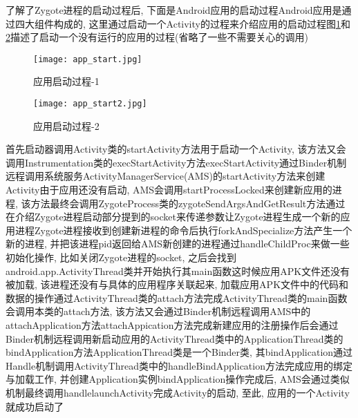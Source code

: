 了解了Zygote进程的启动过程后, 下面是Android应用的启动过程\juhao Android应用是通过四大组件构成的, 这里通过启动一个Activity的过程来介绍应用的启动过程\juhao 图\ref{appStart}和\ref{appStart2}描述了启动一个没有运行的应用的过程(省略了一些不需要关心的调用)\juhao
\begin{figure}[ht]
	\centering
	\texttt{[image: app\_start.jpg]}
	\caption{应用启动过程-1}
	\label{appStart}
\end{figure}

\begin{figure}[ht]
	\centering
	\texttt{[image: app\_start2.jpg]}
	\caption{应用启动过程-2}
	\label{appStart2}
\end{figure}
首先启动器调用Activity类的startActivity方法用于启动一个Activity, 该方法又会调用Instrumentation类的execStartActivity方法\juhao  execStartActivity通过Binder机制远程调用系统服务ActivityManagerService(AMS)的startActivity方法来创建Activity\juhao 由于应用还没有启动, AMS会调用startProcessLocked来创建新应用的进程, 该方法最终会调用ZygoteProcess类的zygoteSendArgsAndGetResult方法通过在介绍Zygote进程启动部分提到的socket来传递参数让Zygote进程生成一个新的应用进程\juhao Zygote进程接收到创建新进程的命令后执行forkAndSpecialize方法产生一个新的进程, 并把该进程pid返回给AMS\juhao 新创建的进程通过handleChildProc来做一些初始化操作, 比如关闭Zygote进程的socket, 之后会找到android.app.ActivityThread类并开始执行其main函数\juhao 这时候应用APK文件还没有被加载, 该进程还没有与具体的应用程序关联起来, 加载应用APK文件中的代码和数据的操作通过ActivityThread类的attach方法完成\juhao ActivityThread类的main函数会调用本类的attach方法, 该方法又会通过Binder机制远程调用AMS中的attachApplication方法\juhao attachAppication方法完成新建应用的注册操作后会通过Binder机制远程调用新启动应用的ActivityThread类中的ApplicationThread类的bindApplication方法\juhao ApplicationThread类是一个Binder类, 其bindApplication通过Handle机制调用ActivityThread类中的handleBindApplication方法完成应用的绑定与加载工作, 并创建Application实例\juhao bindApplication操作完成后, AMS会通过类似机制最终调用handlelaunchActivity完成Activity的启动, 至此, 应用的一个Activity就成功启动了\juhao 

